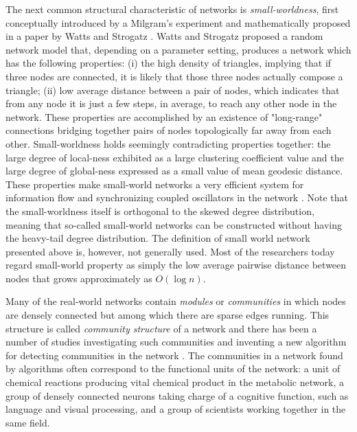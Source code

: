 \documentclass{article}
\begin{document}
	The next common structural characteristic of networks is \textit{small-worldness}, first conceptually introduced by a Milgram's experiment \cite{Milgram} and mathematically proposed in a paper by Watts and Strogatz \cite{watts1998cds}. Watts and Strogatz proposed a random network model that, depending on a parameter setting, produces a network which has the following properties: (i) the high density of triangles, implying that if three nodes are connected, it is likely that those three nodes actually compose a triangle; (ii) low average distance between a pair of nodes, which indicates that from any node it is just a few steps, in average, to reach any other node in the network. These properties are accomplished by an existence of "long-range" connections bridging together pairs of nodes topologically far away from each other. Small-worldness holds seemingly contradicting properties together: the large degree of local-ness exhibited as a large clustering coefficient value and the large degree of global-ness expressed as a small value of mean geodesic distance.  These properties make small-world networks a very efficient system for information flow \cite{SmallWorldEfficiency} and synchronizing coupled oscillators in the network \cite{SmallWorldSynchronization}. Note that the small-worldness itself is orthogonal to the skewed degree distribution, meaning that so-called small-world networks can be constructed without having the heavy-tail degree distribution. The definition of small world network presented above is, however, not generally used. Most of the researchers today regard small-world property as simply the low average pairwise distance between nodes that grows approximately as $O(\log n)$.
	
	
	Many of the real-world networks contain \textit{modules} or \textit{communities} in which nodes are densely connected but among which there are sparse edges running. This structure is called \textit{community structure} of a network and there has been a number of studies investigating such communities and inventing a new algorithm for detecting communities in the network \cite{Modularity1, Modularity2, ModularityReview}. The communities in a network found by algorithms often correspond to the functional units of the network: a unit of chemical reactions producing vital chemical product in the metabolic network, a group of densely connected neurons taking charge of a cognitive function, such as language and visual processing, and a group of scientists working together in the same field.
	
\end{document}
